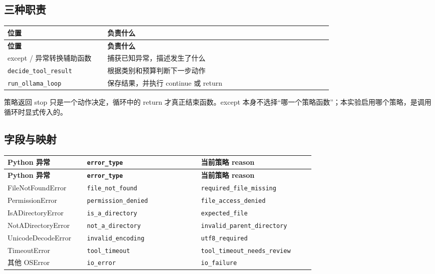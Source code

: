 \subsection{三种职责}

{\small\setlength{\tabcolsep}{4pt}
\renewcommand{\arraystretch}{1.25}
\begin{longtable}{>{\raggedright\arraybackslash}p{0.28\linewidth}>{\raggedright\arraybackslash}p{0.63\linewidth}}
\toprule
\textbf{位置} & \textbf{负责什么} \\
\midrule\endfirsthead
\toprule
\textbf{位置} & \textbf{负责什么} \\
\midrule\endhead
\bottomrule\endfoot
except / 异常转换辅助函数 & 捕获已知异常，描述发生了什么 \\
\nolinkurl{decide_tool_result} & 根据类别和预算判断下一步动作 \\
\nolinkurl{run_ollama_loop} & 保存结果，并执行 continue 或 return \\
\end{longtable}}

策略返回 stop 只是一个动作决定，循环中的 return 才真正结束函数。except 本身不选择“哪一个策略函数”；本实验启用哪个策略，是调用循环时显式传入的。

\subsection{字段与映射}

{\small\setlength{\tabcolsep}{4pt}
\renewcommand{\arraystretch}{1.25}
\begin{longtable}{>{\raggedright\arraybackslash}p{0.23\linewidth}>{\raggedright\arraybackslash}p{0.33\linewidth}>{\raggedright\arraybackslash}p{0.33\linewidth}}
\toprule
\textbf{Python 异常} & \textbf{\nolinkurl{error_type}} & \textbf{当前策略 reason} \\
\midrule\endfirsthead
\toprule
\textbf{Python 异常} & \textbf{\nolinkurl{error_type}} & \textbf{当前策略 reason} \\
\midrule\endhead
\bottomrule\endfoot
FileNotFoundError & \nolinkurl{file_not_found} & \nolinkurl{required_file_missing} \\
PermissionError & \nolinkurl{permission_denied} & \nolinkurl{file_access_denied} \\
IsADirectoryError & \nolinkurl{is_a_directory} & \nolinkurl{expected_file} \\
NotADirectoryError & \nolinkurl{not_a_directory} & \nolinkurl{invalid_parent_directory} \\
UnicodeDecodeError & \nolinkurl{invalid_encoding} & \nolinkurl{utf8_required} \\
TimeoutError & \nolinkurl{tool_timeout} & \nolinkurl{tool_timeout_needs_review} \\
其他 OSError & \nolinkurl{io_error} & \nolinkurl{io_failure} \\
\end{longtable}}

